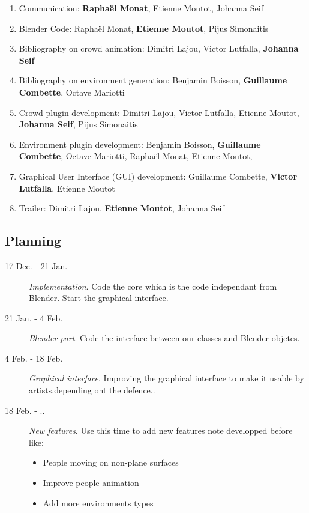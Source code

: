 \documentclass[a4paper,11pt]{article}
\newcommand\bb{Benjamin Boisson}
\newcommand\gc{Guillaume Combette}
\newcommand\dl{Dimitri Lajou}
\newcommand\vl{Victor Lutfalla}
\newcommand\om{Octave Mariotti}
\newcommand\mr{Raphaël Monat}
\newcommand\me{Etienne Moutot} %
\newcommand\js{Johanna Seif}
\newcommand\ps{Pijus Simonaitis}
\begin{document}
\begin{enumerate}[label=WP\arabic*:, start=0]
\item Communication: \textbf{\mr}, \me, \js
\item Blender Code: \mr, \textbf{\me}, \ps
\item Bibliography on crowd animation: \dl, \vl, \textbf{\js}
\item Bibliography on environment generation: \bb, \textbf{\gc}, \om
\item Crowd plugin development: \dl, \vl, \me, \textbf{\js}, \ps
\item Environment plugin development: \bb, \textbf{\gc}, \om, \mr, \me,
\item Graphical User Interface (GUI) development: \gc, \textbf{\vl}, \me
\item Trailer: \dl, \textbf{\me}, \js
\end{enumerate}

\subsection{Planning}
\begin{description}
  \item[17 Dec. - 21 Jan.] \textit{Implementation}. Code the core which is the code independant from Blender. Start the graphical interface.
  \item[21 Jan. - 4 Feb.] \textit{Blender part}. Code the interface between our classes and Blender objetcs.
  \item[4 Feb. - 18 Feb.] \textit{Graphical interface}. Improving the graphical interface to make it usable by artists.depending ont the defence..
  \item[18 Feb. - ..] \textit{New features}.
Use this time to add new features note developped before like:
  \begin{itemize}
    \item People moving on non-plane surfaces
    \item Improve people animation
    \item Add more environments types
  \end{itemize}
\end{description}











\begingroup




\endgroup
\end{document}
